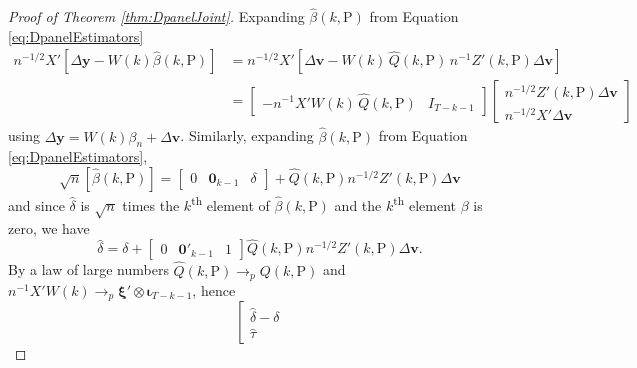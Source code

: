\begin{proof}[Proof of Theorem \ref{thm:DpanelJoint}]
  Expanding $\widehat{\beta}(k,\text{P})$ from Equation \ref{eq:DpanelEstimators} 
  \begin{align*}
    n^{-1/2}X'\left[ \Delta \mathbf{y} - W(k)\widehat{\beta}(k,\text{P})  \right] 
    &= n^{-1/2}X'\left[ \Delta \mathbf{v}  - W(k)\, \widehat{Q}(k,\text{P}) \, n^{-1} Z'(k,\text{P})\Delta \mathbf{v}\right] \\
    &= \left[
    \begin{array}{cc}
      -n^{-1} X'W(k) \, \widehat{Q}(k,\text{P}) & I_{T-k-1}
    \end{array}
  \right] 
  \left[
  \begin{array}{c}
    n^{-1/2}Z'(k,\text{P}) \Delta \mathbf{v} \\
    n^{-1/2} X' \Delta \mathbf{v}
  \end{array}
\right]
  \end{align*}
  using $\Delta \mathbf{y} = W(k) \beta_n + \Delta \mathbf{v}$. 
  Similarly, expanding $\widehat{\beta}(k,\text{P})$ from Equation \ref{eq:DpanelEstimators},
  \[
    \sqrt{n}\left[ \widehat{\beta}(k,\text{P}) \right] = \left[
    \begin{array}{ccc}
      0 & \mathbf{0}_{k-1} & \delta  
    \end{array}
  \right] + \widehat{Q}(k,\text{P}) n^{-1/2}Z'(k,\text{P}) \Delta \mathbf{v}
  \]
  and since $\widehat{\delta}$ is $\sqrt{n}$ times the $k$\textsuperscript{th} element of $\widehat{\beta}(k,\text{P})$ and the $k$\textsuperscript{th} element $\beta$ is zero, we have
  \[
    \widehat{\delta} = \delta + \left[
    \begin{array}{ccc}
    0 & \mathbf{0}'_{k-1} & 1  
    \end{array}
  \right] \widehat{Q}(k,\text{P}) n^{-1/2} Z'(k,\text{P})\Delta \mathbf{v}.
  \]
  By a law of large numbers $\widehat{Q}(k,\text{P}) \rightarrow_p Q(k,\text{P})$ and $n^{-1}X'W(k) \rightarrow_p \boldsymbol{\xi}' \otimes \boldsymbol{\iota}_{T-k-1}$, hence 
  \[
    \left[
    \begin{array}{c}
      \widehat{\delta} - \delta \\ \widehat{\tau}

\end{array}\]
\end{proof}

